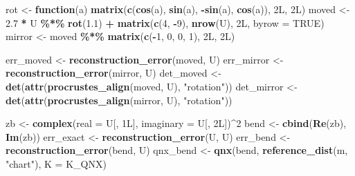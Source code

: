 \documentclass[
  british,
  a4paper,
]{book}
\newenvironment{Shaded}{\begin{snugshade}}{\end{snugshade}}
\newcommand{\AttributeTok}[1]{\textcolor[rgb]{0.13,0.29,0.53}{#1}}
\newcommand{\ConstantTok}[1]{\textcolor[rgb]{0.56,0.35,0.01}{#1}}
\newcommand{\ControlFlowTok}[1]{\textcolor[rgb]{0.13,0.29,0.53}{\textbf{#1}}}
\newcommand{\DataTypeTok}[1]{\textcolor[rgb]{0.13,0.29,0.53}{#1}}
\newcommand{\DecValTok}[1]{\textcolor[rgb]{0.00,0.00,0.81}{#1}}
\newcommand{\FloatTok}[1]{\textcolor[rgb]{0.00,0.00,0.81}{#1}}
\newcommand{\FunctionTok}[1]{\textcolor[rgb]{0.13,0.29,0.53}{\textbf{#1}}}
\newcommand{\NormalTok}[1]{#1}
\newcommand{\OtherTok}[1]{\textcolor[rgb]{0.56,0.35,0.01}{#1}}
\newcommand{\SpecialCharTok}[1]{\textcolor[rgb]{0.81,0.36,0.00}{\textbf{#1}}}
\newcommand{\StringTok}[1]{\textcolor[rgb]{0.31,0.60,0.02}{#1}}
\begin{document}
\begin{Shaded}
\begin{Highlighting}[]
\NormalTok{rot    }\OtherTok{\textless{}{-}} \ControlFlowTok{function}\NormalTok{(a) }\FunctionTok{matrix}\NormalTok{(}\FunctionTok{c}\NormalTok{(}\FunctionTok{cos}\NormalTok{(a), }\FunctionTok{sin}\NormalTok{(a), }\SpecialCharTok{{-}}\FunctionTok{sin}\NormalTok{(a), }\FunctionTok{cos}\NormalTok{(a)), }\DecValTok{2}\DataTypeTok{L}\NormalTok{, }\DecValTok{2}\DataTypeTok{L}\NormalTok{)}
\NormalTok{moved  }\OtherTok{\textless{}{-}} \FloatTok{2.7} \SpecialCharTok{*}\NormalTok{ U }\SpecialCharTok{\%*\%} \FunctionTok{rot}\NormalTok{(}\FloatTok{1.1}\NormalTok{) }\SpecialCharTok{+} \FunctionTok{matrix}\NormalTok{(}\FunctionTok{c}\NormalTok{(}\DecValTok{4}\NormalTok{, }\SpecialCharTok{{-}}\DecValTok{9}\NormalTok{), }\FunctionTok{nrow}\NormalTok{(U), }\DecValTok{2}\DataTypeTok{L}\NormalTok{, }\AttributeTok{byrow =} \ConstantTok{TRUE}\NormalTok{)}
\NormalTok{mirror }\OtherTok{\textless{}{-}}\NormalTok{ moved }\SpecialCharTok{\%*\%} \FunctionTok{matrix}\NormalTok{(}\FunctionTok{c}\NormalTok{(}\SpecialCharTok{{-}}\DecValTok{1}\NormalTok{, }\DecValTok{0}\NormalTok{, }\DecValTok{0}\NormalTok{, }\DecValTok{1}\NormalTok{), }\DecValTok{2}\DataTypeTok{L}\NormalTok{, }\DecValTok{2}\DataTypeTok{L}\NormalTok{)}

\NormalTok{err\_moved  }\OtherTok{\textless{}{-}} \FunctionTok{reconstruction\_error}\NormalTok{(moved,  U)}
\NormalTok{err\_mirror }\OtherTok{\textless{}{-}} \FunctionTok{reconstruction\_error}\NormalTok{(mirror, U)}
\NormalTok{det\_moved  }\OtherTok{\textless{}{-}} \FunctionTok{det}\NormalTok{(}\FunctionTok{attr}\NormalTok{(}\FunctionTok{procrustes\_align}\NormalTok{(moved,  U), }\StringTok{"rotation"}\NormalTok{))}
\NormalTok{det\_mirror }\OtherTok{\textless{}{-}} \FunctionTok{det}\NormalTok{(}\FunctionTok{attr}\NormalTok{(}\FunctionTok{procrustes\_align}\NormalTok{(mirror, U), }\StringTok{"rotation"}\NormalTok{))}

\NormalTok{zb       }\OtherTok{\textless{}{-}} \FunctionTok{complex}\NormalTok{(}\AttributeTok{real =}\NormalTok{ U[, }\DecValTok{1}\DataTypeTok{L}\NormalTok{], }\AttributeTok{imaginary =}\NormalTok{ U[, }\DecValTok{2}\DataTypeTok{L}\NormalTok{])}\SpecialCharTok{\^{}}\DecValTok{2}
\NormalTok{bend     }\OtherTok{\textless{}{-}} \FunctionTok{cbind}\NormalTok{(}\FunctionTok{Re}\NormalTok{(zb), }\FunctionTok{Im}\NormalTok{(zb))}
\NormalTok{err\_exact }\OtherTok{\textless{}{-}} \FunctionTok{reconstruction\_error}\NormalTok{(U, U)}
\NormalTok{err\_bend  }\OtherTok{\textless{}{-}} \FunctionTok{reconstruction\_error}\NormalTok{(bend, U)}
\NormalTok{qnx\_bend }\OtherTok{\textless{}{-}} \FunctionTok{qnx}\NormalTok{(bend, }\FunctionTok{reference\_dist}\NormalTok{(m, }\StringTok{"chart"}\NormalTok{), }\AttributeTok{K =}\NormalTok{ K\_QNX)}
\end{Highlighting}
\end{Shaded}
\end{document}
